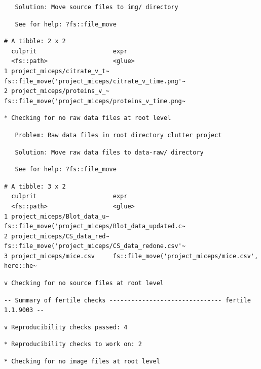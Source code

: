 \documentclass[12pt,twoside]{reedthesis}
\begin{document}
\begin{verbatim}
   Solution: Move source files to img/ directory
\end{verbatim}
\begin{verbatim}
   See for help: ?fs::file_move
\end{verbatim}
\begin{verbatim}
# A tibble: 2 x 2
  culprit                     expr                                              
  <fs::path>                  <glue>                                            
1 project_miceps/citrate_v_t~ fs::file_move('project_miceps/citrate_v_time.png'~
2 project_miceps/proteins_v_~ fs::file_move('project_miceps/proteins_v_time.png~
\end{verbatim}
\begin{verbatim}
* Checking for no raw data files at root level
\end{verbatim}
\begin{verbatim}
   Problem: Raw data files in root directory clutter project
\end{verbatim}
\begin{verbatim}
   Solution: Move raw data files to data-raw/ directory
\end{verbatim}
\begin{verbatim}
   See for help: ?fs::file_move
\end{verbatim}
\begin{verbatim}
# A tibble: 3 x 2
  culprit                     expr                                              
  <fs::path>                  <glue>                                            
1 project_miceps/Blot_data_u~ fs::file_move('project_miceps/Blot_data_updated.c~
2 project_miceps/CS_data_red~ fs::file_move('project_miceps/CS_data_redone.csv'~
3 project_miceps/mice.csv     fs::file_move('project_miceps/mice.csv', here::he~
\end{verbatim}
\begin{verbatim}
v Checking for no source files at root level
\end{verbatim}
\begin{verbatim}
-- Summary of fertile checks ------------------------------- fertile 1.1.9003 --
\end{verbatim}
\begin{verbatim}
v Reproducibility checks passed: 4
\end{verbatim}
\begin{verbatim}
* Reproducibility checks to work on: 2
\end{verbatim}
\begin{verbatim}
* Checking for no image files at root level
\end{verbatim}
\end{document}
